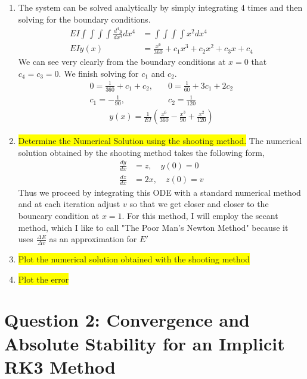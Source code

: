 \documentclass{article}
\begin{document}
\begin{enumerate}[label=\alph*)]

  \item The system can be solved analytically by simply integrating 4 times and
  then solving for the boundary conditions. 
  \begin{align*}
    EI\int\int\int\int \frac{d^4y}{dx^4} dx^4 &= \int\int\int\int x^2 dx^4\\
    EIy(x) &= \frac{x^6}{360} + c_1x^3 + c_2x^2 + c_3x + c_4
  \end{align*}
  We can see very clearly from the boundary conditions at $x=0$ that $c_4=c_3=0$.
  We finish solving for $c_1$ and $c_2$.
  \begin{align*}
    0 = \frac{1}{360} + c_1 + c_2, &\quad 0 = \frac{1}{60} + 3c_1 + 2c_2\\
    c_1 = -\frac{1}{90}, &\quad c_2 = \frac{1}{120}
  \end{align*}
  \begin{align*}
    y(x) = \frac{1}{EI}\left(\frac{x^6}{360} - \frac{x^3}{90} +
    \frac{x^2}{120}\right)
  \end{align*}

  \item \colorbox{yellow}{Determine the Numerical Solution using the shooting method.}
  The numerical solution obtained by the shooting method takes the following
  form,
  \begin{align*}
    \frac{dy}{dx} &= z, \quad y(0) = 0\\
    \frac{dz}{dx} &= 2x, \quad z(0) = v
  \end{align*}
  Thus we proceed by integrating this ODE with a standard numerical method and
  at each iteration adjust $v$ so that we get closer and closer to the bouncary
  condition at $x=1$. For this method, I will employ the secant method, which I
  like to call "The Poor Man's Newton Method" because it uses $\frac{\Delta E}{\Delta
  v}$ as an approximation for $E'$


  \item \colorbox{yellow}{Plot the numerical solution obtained with the shooting
  method}

  \item \colorbox{yellow}{Plot the error}

\end{enumerate}


\section*{Question 2: Convergence and Absolute Stability for an Implicit RK3
Method}
\end{document}
